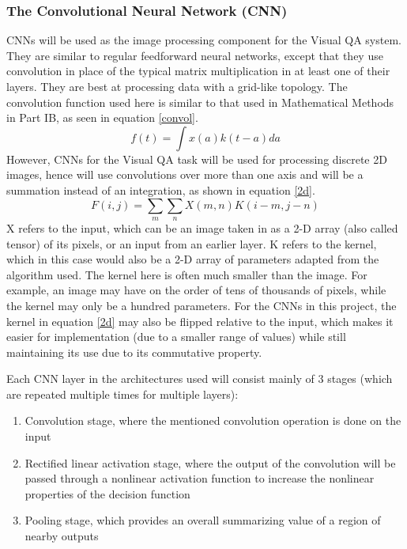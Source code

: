 \documentclass[12pt,a4paper,twoside]{article}
\begin{document}
\subsubsection*{The Convolutional Neural Network (CNN)}
CNNs will be used as the image processing component for the Visual QA system. They are similar to regular feedforward neural networks, except that they use convolution in place of the typical matrix multiplication in at least one of their layers. They are best at processing data with a grid-like topology. The convolution function used here is similar to that used in Mathematical Methods in Part IB, as seen in equation \ref{convol}.
\begin{equation} \label{convol}
f(t) = \int x(a)k(t-a) da
\end{equation}
However, CNNs for the Visual QA task will be used for processing discrete 2D images, hence will use convolutions over more than one axis and will be a summation instead of an integration, as shown in equation \ref{2d}.
\begin{equation}\label{2d}
F(i,j) = \sum_m\sum_n X(m,n)K(i-m, j-n)
\end{equation}
X refers to the input, which can be an image taken in as a 2-D array (also called tensor) of its pixels, or an input from an earlier layer. K refers to the kernel, which in this case would also be a 2-D array of parameters adapted from the algorithm used. The kernel here is often much smaller than the image. For example, an image may have on the order of tens of thousands of pixels, while the kernel may only be a hundred parameters. For the CNNs in this project, the kernel in equation \ref{2d} may also be flipped relative to the input, which makes it easier for implementation (due to a smaller range of values) while still maintaining its use due to its commutative property.

Each CNN layer in the architectures used will consist mainly of 3 stages (which are repeated multiple times for multiple layers):
\begin{enumerate}
	\item Convolution stage, where the mentioned convolution operation is done on the input
	\item Rectified linear activation stage, where the output of the convolution will be passed through a nonlinear activation function to increase the nonlinear properties of the decision function
	\item Pooling stage, which provides an overall summarizing value of a region of nearby outputs
\end{enumerate}
\end{document}
